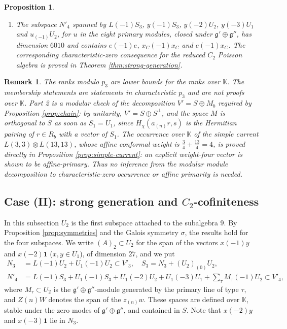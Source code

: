 \documentclass[leqno]{article}
\newcommand{\K}{\ensuremath{\mathbb{K}}}
\newcommand{\ot}{\otimes}
\newtheorem{prop}[thm]{Proposition}
\newtheorem{remark}[thm]{Remark}
\numberwithin{equation}{section}
\begin{document}
\begin{prop}
\begin{enumerate}
\item The subspace $N'_4$ spanned by $L(-1)S_3$, $y(-1)S_3$, $y(-2)U_2$, $y(-3)U_1$ and $u_{(-1)}U_2$, for $u$ in the eight primary modules, closed under $\mathfrak g' \oplus \mathfrak g''$, has dimension $6010$ and contains $e(-1)e$, $x_C(-1)x_C$ and $e(-1)x_C$. The corresponding characteristic-zero consequence for the reduced $C_2$ Poisson algebra is proved in Theorem \ref{thm:strong-generation}.
\end{enumerate}
\end{prop}

\begin{remark}\normalfont
\label{rem:weight-four-meaning}
The ranks modulo $p_3$ are lower bounds for the ranks over $\K$. The membership statements are statements in characteristic $p_3$ and are not proofs over $\K$. Part 2 is a modular check of the decomposition $V' = S \oplus M_b$ required by Proposition \ref{prop:chain}: by unitarity, $V' = S \oplus S^\perp$, and the space $M$ is orthogonal to $S$ as soon as $S_1 = U_1$, since $H_\chi(a_{(n)}r,s)$ is the Hermitian pairing of $r \in R_b$ with a vector of $S_1$. The occurrence over $\K$ of the simple current $L(3,3) \ot L(13,13)$, whose affine conformal weight is $\frac34 + \frac{13}{4} = 4$, is proved directly in Proposition \ref{prop:simple-current}: an explicit weight-four vector is shown to be affine-primary. Thus no inference from the modular module decomposition to characteristic-zero occurrence or affine primarity is needed.
\end{remark}


\subsection{Case (II): strong generation and \texorpdfstring{$C_2$}{C2}-cofiniteness}
\label{subsec:strong-generation}

In this subsection $U_2$ is the first subspace attached to the subalgebra $9$. By Proposition \ref{prop:symmetries} and the Galois symmetry $\sigma$, the results hold for the four subspaces. We write $(A)_2 \subset U_2$ for the span of the vectors $x(-1)y$ and $x(-2)\mathbf 1$ ($x,y \in U_1$), of dimension $27$, and we put
\begin{align*}
N_3 &= L(-1)U_2 + U_1(-1)U_2 \subset V'_3, \quad S_3 = N_3 + (U_2)_{(0)}U_2,\\
N'_4 &= L(-1)S_3 + U_1(-1)S_3 + U_1(-2)U_2 + U_1(-3)U_1 + \textstyle\sum_{\tau} M_\tau(-1)U_2 \subset V'_4,
\end{align*}
where $M_\tau \subset U_2$ is the $\mathfrak g' \oplus \mathfrak g''$-module generated by the primary line of type $\tau$, and $Z(n)W$ denotes the span of the $z_{(n)}w$. These spaces are defined over $\K$, stable under the zero modes of $\mathfrak g' \oplus \mathfrak g''$, and contained in $S$. Note that $x(-2)y$ and $x(-3)\mathbf 1$ lie in $N_3$.
\end{document}
